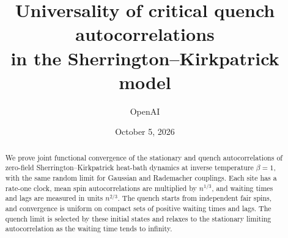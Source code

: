\documentclass[11pt]{article}
\title{Universality of critical quench autocorrelations\\
in the Sherrington--Kirkpatrick model}
\author{OpenAI}
\date{October 5, 2026}
\numberwithin{equation}{section}
\theoremstyle{definition}
\theoremstyle{remark}
\begin{document}
\maketitle
\begin{abstract}
We prove joint functional convergence of the stationary and quench
autocorrelations of zero-field Sherrington--Kirkpatrick heat-bath dynamics
at inverse temperature $\beta=1$, with the same random limit for Gaussian
and Rademacher couplings. Each site has a rate-one clock, mean spin
autocorrelations are multiplied by $n^{1/3}$, and waiting times and lags
are measured in units $n^{2/3}$. The quench starts from independent fair
spins, and convergence is uniform on compact sets of positive waiting
times and lags. The quench limit is selected by these initial states and
relaxes to the stationary limiting autocorrelation as the waiting time
tends to infinity.
\end{abstract}
\tableofcontents










\begingroup
\raggedright


\endgroup
\end{document}
